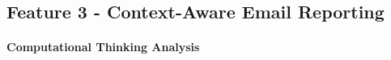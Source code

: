 \endgroup







\subsection*{Feature 3 - Context-Aware Email Reporting}

\label{sec:feature-3}



\paragraph*{Computational Thinking Analysis}

